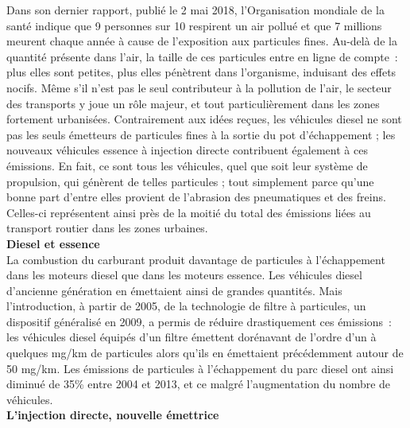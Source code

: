 \documentclass[8pt]{article}
\begin{document}
Dans son dernier rapport, publié le 2 mai 2018, l’Organisation mondiale de la santé indique que 9 personnes sur 10 respirent un air pollué et que 7 millions meurent chaque année à cause de l’exposition aux particules fines. Au-delà de la quantité présente dans l’air, la taille de ces particules entre en ligne de compte~: plus elles sont petites, plus elles pénètrent dans l’organisme, induisant des effets nocifs.
Même s’il n’est pas le seul contributeur à la pollution de l’air, le secteur des transports y joue un rôle majeur, et tout particulièrement dans les zones fortement urbanisées.
Contrairement aux idées reçues, les véhicules diesel ne sont pas les seuls émetteurs de particules fines à la sortie du pot d’échappement ; les nouveaux véhicules essence à injection directe contribuent également à ces émissions.
En fait, ce sont tous les véhicules, quel que soit leur système de propulsion, qui génèrent de telles particules ; tout simplement parce qu’une bonne part d’entre elles provient de l’abrasion des pneumatiques et des freins. Celles-ci représentent ainsi près de la moitié du total des émissions liées au transport routier dans les zones urbaines.\\

\textbf{Diesel et essence}\\

La combustion du carburant produit davantage de particules à l’échappement dans les moteurs diesel que dans les moteurs essence. Les véhicules diesel d’ancienne génération en émettaient ainsi de grandes quantités.
Mais l’introduction, à partir de 2005, de la technologie de filtre à particules, un dispositif généralisé en 2009, a permis de réduire drastiquement ces émissions~: les véhicules diesel équipés d’un filtre émettent dorénavant de l’ordre d’un à quelques mg/km de particules alors qu’ils en émettaient précédemment autour de 50 mg/km.
Les émissions de particules à l’échappement du parc diesel ont ainsi diminué de 35\% entre 2004 et 2013, et ce malgré l’augmentation du nombre de véhicules.\\

\textbf{L’injection directe, nouvelle émettrice}\\
\end{document}
